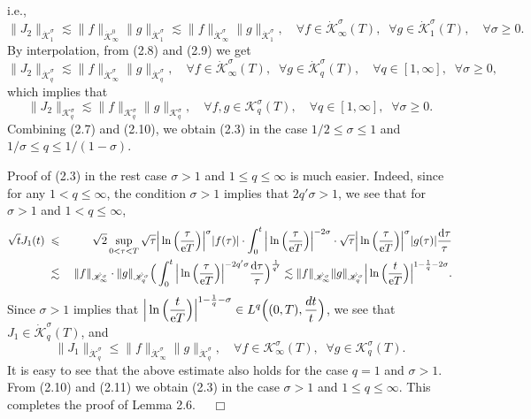 \documentclass[11pt]{article}
\newcommand{\rmd}{\mbox{\rm d}}
\newcommand{\rme}{{\rm e}}
\begin{document}
  i.e.,
\begin{equation}
  \|J_2\|_{\dot{\mathscr{K}}^{\sigma}_1}\lesssim\|f\|_{\dot{\mathscr{K}}^{0}_{\infty}}\|g\|_{\dot{\mathscr{K}}^{\sigma}_1}
  \lesssim\|f\|_{\dot{\mathscr{K}}^{\sigma}_{\infty}}\|g\|_{\dot{\mathscr{K}}^{\sigma}_1},
  \quad \forall f\in\dot{\mathscr{K}}^{\sigma}_{\infty}(T),\;\; \forall g\in\dot{\mathscr{K}}^{\sigma}_1(T),
   \quad \forall\sigma\geqslant 0.
\end{equation}
  By interpolation, from (2.8) and (2.9) we get
$$
  \|J_2\|_{\dot{\mathscr{K}}^{\sigma}_q}\lesssim\|f\|_{\dot{\mathscr{K}}^{\sigma}_{\infty}}\|g\|_{\dot{\mathscr{K}}^{\sigma}_q},
  \quad \forall f\in\dot{\mathscr{K}}^{\sigma}_{\infty}(T),\;\; \forall g\in\dot{\mathscr{K}}^{\sigma}_q(T),
   \quad \forall q\in [1,\infty],\;\; \forall \sigma\geqslant 0,
$$
  which implies that
\begin{equation}
  \|J_2\|_{\mathscr{K}^{\sigma}_q}\lesssim\|f\|_{\mathscr{K}^{\sigma}_q}\|g\|_{\mathscr{K}^{\sigma}_q},
  \quad \forall f,g\in\mathscr{K}^{\sigma}_q(T), \quad \forall q\in [1,\infty],\;\; \forall \sigma\geqslant 0.
\end{equation}
  Combining (2.7) and (2.10), we obtain (2.3) in the case $1/2\leqslant\sigma\leqslant 1$ and $1/\sigma\leqslant q\leqslant 1/(1\!-\!\sigma)$.

  Proof of (2.3) in the rest case $\sigma>1$ and $1\leqslant q\leqslant\infty$ is much easier. Indeed, since for any $1<q\leqslant\infty$, the
  condition $\sigma>1$ implies that $2q'\sigma>1$, we see that for $\sigma>1$ and $1<q\leqslant\infty$,
\begin{eqnarray*}
  \sqrt{t}J_1(t)&\;\leqslant\;&\sqrt{2}\sup_{0<\tau<T}\sqrt{\tau}\Big|\ln\Big(\frac{\tau}{\rme T}\Big)\Big|^{\sigma}|f(\tau)|\cdot
  \int_0^t\Big|\ln\Big(\frac{\tau}{\rme T}\Big)\Big|^{-2\sigma}\cdot\sqrt{\tau}\Big|\ln\Big(\frac{\tau}{\rme T}\Big)\Big|^{\sigma}
  |g(\tau)|\frac{\rmd\tau}{\tau}
\\
  &\;\lesssim\;&\|f\|_{\dot{\mathscr{K}}^{\sigma}_{\infty}}\cdot\|g\|_{\dot{\mathscr{K}}^{\sigma}_q}
  \Big(\int_0^t\Big|\ln\Big(\frac{\tau}{\rme T}\Big)\Big|^{-2q'\sigma}\frac{\rmd\tau}{\tau}\Big)^{\frac{1}{q'}}
  \lesssim\|f\|_{\dot{\mathscr{K}}^{\sigma}_{\infty}}\|g\|_{\dot{\mathscr{K}}^{\sigma}_q}
  \Big|\ln\Big(\frac{t}{\rme T}\Big)\Big|^{1-\frac{1}{q}-2\sigma}.
\end{eqnarray*}
  Since $\sigma>1$ implies that $\displaystyle\Big|\ln\Big(\frac{t}{\rme T}\Big)\Big|^{1-\frac{1}{q}-\sigma}\in L^q\Big((0,T),\frac{dt}{t}\Big)$,
  we see that $J_1\in\dot{\mathscr{K}}^{\sigma}_q(T)$, and
\begin{equation}
  \|J_1\|_{\dot{\mathscr{K}}^{\sigma}_q}\leqslant\|f\|_{\dot{\mathscr{K}}^{\sigma}_{\infty}}\|g\|_{\dot{\mathscr{K}}^{\sigma}_q},
  \quad \forall f\in\mathscr{K}^{\sigma}_{\infty}(T),\;\; \forall g\in\mathscr{K}^{\sigma}_q(T).
\end{equation}
  It is easy to see that the above estimate also holds for the case $q=1$ and $\sigma>1$. From (2.10) and (2.11) we obtain (2.3) in the case $\sigma>1$
  and $1\leqslant q\leqslant\infty$. This completes the proof of Lemma 2.6. $\quad\Box$
\end{document}
